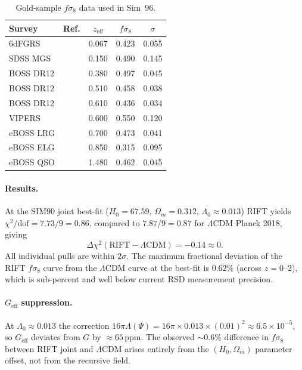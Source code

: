 \documentclass[12pt,a4paper]{article}
\begin{document}
\begin{table}[h]
\centering
\caption{Gold-sample $f\sigma_8$ data used in Sim~96.}
\label{tab:rsd_data}
\begin{tabular}{llccc}
\hline
Survey & Ref. & $z_\mathrm{eff}$ & $f\sigma_8$ & $\sigma$ \\
\hline
6dFGRS      & \citet{Beutler2012}   & 0.067 & 0.423 & 0.055 \\
SDSS MGS    & \citet{Howlett2015}   & 0.150 & 0.490 & 0.145 \\
BOSS DR12   & \citet{Alam2017}      & 0.380 & 0.497 & 0.045 \\
BOSS DR12   & \citet{Alam2017}      & 0.510 & 0.458 & 0.038 \\
BOSS DR12   & \citet{Alam2017}      & 0.610 & 0.436 & 0.034 \\
VIPERS      & \citet{Pezzotta2017}  & 0.600 & 0.550 & 0.120 \\
eBOSS LRG   & \citet{GilMarin2020}  & 0.700 & 0.473 & 0.041 \\
eBOSS ELG   & \citet{deMattia2021}  & 0.850 & 0.315 & 0.095 \\
eBOSS QSO   & \citet{Neveux2020}    & 1.480 & 0.462 & 0.045 \\
\hline
\end{tabular}
\end{table}

\paragraph{Results.}  At the SIM90 joint best-fit ($H_0=67.59$, $\Omega_m=0.312$,
$\Lambda_0\approx0.013$) RIFT yields $\chi^2/\mathrm{dof}=7.73/9=0.86$, compared to
$7.87/9=0.87$ for $\Lambda$CDM Planck 2018, giving
\begin{equation}
  \Delta\chi^2(\mathrm{RIFT}-\Lambda\mathrm{CDM}) = -0.14 \approx 0.
\end{equation}
All individual pulls are within $2\sigma$.  The maximum fractional deviation of the
RIFT $f\sigma_8$ curve from the $\Lambda$CDM curve at the best-fit is $0.62\%$
(across $z=0$--$2$), which is sub-percent and well below current RSD measurement
precision.

\paragraph{$G_\mathrm{eff}$ suppression.}  At $\Lambda_0\approx0.013$ the correction
$16\pi\Lambda(\Psi)= 16\pi\times0.013\times(0.01)^2\approx6.5\times10^{-5}$, so
$G_\mathrm{eff}$ deviates from $G$ by $\approx65\,\mathrm{ppm}$.  The observed
$\sim\!0.6\%$ difference in $f\sigma_8$ between RIFT joint and $\Lambda$CDM arises
entirely from the $(H_0,\Omega_m)$ parameter offset, not from the recursive field.
\end{document}
